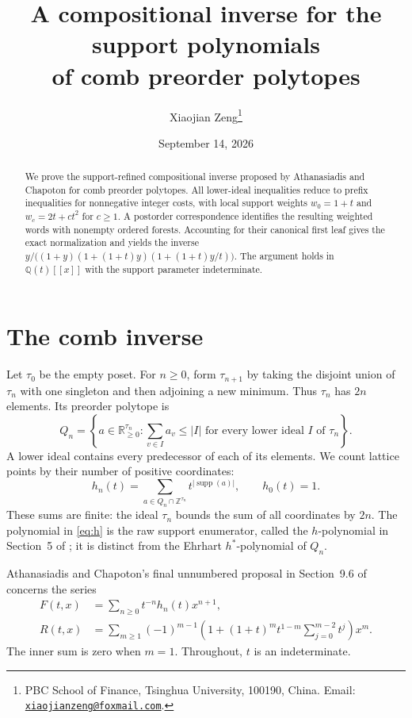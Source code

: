 \documentclass[11pt]{article}
\title{A compositional inverse for the support polynomials\protect\\ of comb preorder polytopes}
\author{Xiaojian Zeng\thanks{PBC School of Finance, Tsinghua University, 100190, China.\newline
Email: \href{mailto:xiaojianzeng@foxmail.com}{\texttt{xiaojianzeng@foxmail.com}}.}}
\date{September 14, 2026}
\newcommand{\Q}{\mathbb{Q}}
\newcommand{\Z}{\mathbb{Z}}
\DeclareMathOperator{\supp}{supp}
\begin{document}
\maketitle

\begin{abstract}
We prove the support-refined compositional inverse proposed by Athanasiadis
and Chapoton for comb preorder polytopes. All lower-ideal inequalities reduce
to prefix inequalities for nonnegative integer costs, with local support
weights $w_0=1+t$ and $w_c=2t+ct^2$ for $c\geq1$. A postorder correspondence
identifies the resulting weighted words with nonempty ordered forests.
Accounting for their canonical first leaf gives the exact normalization and
yields the inverse $y/\bigl((1+y)(1+(1+t)y)(1+(1+t)y/t)\bigr)$.
The argument holds in $\Q(t)[[x]]$ with the support parameter indeterminate.
\end{abstract}

\section{The comb inverse}

Let $\tau_0$ be the empty poset. For $n\geq0$, form $\tau_{n+1}$ by taking
the disjoint union of $\tau_n$ with one singleton and then adjoining a new
minimum. Thus $\tau_n$ has $2n$ elements. Its preorder polytope is
\begin{equation}\label{eq:polytope}
 Q_n=\left\{a\in\mathbb{R}_{\geq0}^{\tau_n}:
       \sum_{v\in I}a_v\leq |I|
       \text{ for every lower ideal }I\text{ of }\tau_n\right\}.
\end{equation}
A lower ideal contains every predecessor of each of its elements.
We count lattice points by their number of positive coordinates:
\begin{equation}\label{eq:h}
 h_n(t)=\sum_{a\in Q_n\cap\Z^{\tau_n}}
                t^{|\supp(a)|},\qquad h_0(t)=1.
\end{equation}
These sums are finite: the ideal $\tau_n$ bounds the sum of all coordinates
by $2n$. The polynomial in \eqref{eq:h} is the raw support enumerator,
called the $h$-polynomial in Section~5 of \cite{AC}; it is distinct from the
Ehrhart $h^*$-polynomial of $Q_n$.

Athanasiadis and Chapoton's final unnumbered proposal in
Section~9.6 of \cite{AC} concerns the series
\begin{align}
 F(t,x)&=\sum_{n\geq0}t^{-n}h_n(t)x^{n+1},\label{eq:F}\\
 R(t,x)&=\sum_{m\geq1}(-1)^{m-1}
 \left(1+(1+t)^m t^{1-m}\sum_{j=0}^{m-2}t^j\right)x^m.
 \label{eq:R}
\end{align}
The inner sum is zero when $m=1$. Throughout, $t$ is an indeterminate.
\end{document}
